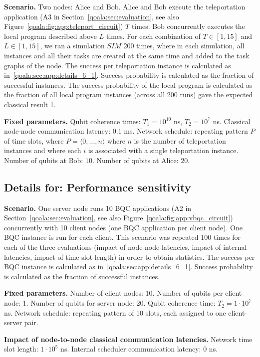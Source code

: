 \textbf{Scenario.}
Two nodes: Alice and Bob.
Alice and Bob execute the teleportation application (A3 in Section~\ref{qoala:sec:evaluation}, see also Figure~\ref{qoala:fig:app:teleport_circuit}) $T$ times.
Bob concurrently executes the local program described above $L$ times.
For each combination of $T \in [1, 15]$ and $L \in [1, 15]$, we ran a simulation $SIM$ 200 times, where in each simulation, all instances and all their tasks are created at the same time and added to the task graphs of the node.
The success per teleportation instance is calculated as in~\ref{qoala:sec:app:details_6_1}.
Success probability is calculated as the fraction of successful instances.
The success probability of the local program is calculated as the fraction of all local program instances (across all 200 runs) gave the expected classical result 1.

\textbf{Fixed parameters.}
Qubit coherence times: $T_1 = 10^{10}$ ns, $T_2 = 10^7$ ns.
Classical node-node communication latency: $0.1$ ms.
Network schedule: repeating pattern $P$ of time slots, where $P = \langle 0, \dots, n \rangle$ where $n$ is the number of teleportation instances and where each $i$ is associated with a single teleportation instance.
Number of qubits at Bob: $10$.
Number of qubits at Alice: $20$.


\subsection{Details for: Performance sensitivity}
\textbf{Scenario.}
One server node runs 10 BQC applications (A2 in Section~\ref{qoala:sec:evaluation}, see also Figure~\ref{qoala:fig:app:vbqc_circuit}) concurrently with 10 client nodes (one BQC application per client node).
One BQC instance is run for each client.
This scenario was repeated 100 times for each of the three evaluations (impact of node-node-latencies, impact of internal latencies, impact of time slot length) in order to obtain statistics.
The success per BQC instance is calculated as in~\ref{qoala:sec:app:details_6_1}.
Success probability is calculated as the fraction of successful instances.

\textbf{Fixed parameters.}
Number of client nodes: 10.
Number of qubits per client node: 1.
Number of qubits for server node: 20.
Qubit coherence time: $T_2 = 1\cdot 10^7$ ns.
Network schedule: repeating pattern of 10 slots, each assigned to one client-server pair.

\textbf{Impact of node-to-node classical communication latencies.}
Network time slot length: $1\cdot 10^5$ ns.
Internal scheduler communication latency: $0$ ns.

